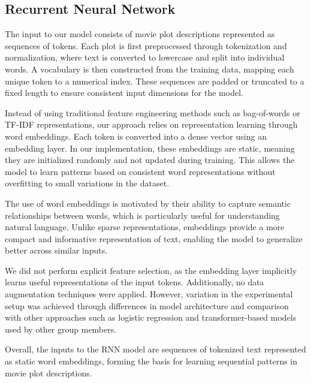 \subsection{Recurrent Neural Network}

The input to our model consists of movie plot descriptions represented as sequences of tokens. Each plot is first preprocessed through tokenization and normalization, where text is converted to lowercase and split into individual words. A vocabulary is then constructed from the training data, mapping each unique token to a numerical index. These sequences are padded or truncated to a fixed length to ensure consistent input dimensions for the model.

Instead of using traditional feature engineering methods such as bag-of-words or TF-IDF representations, our approach relies on representation learning through word embeddings. Each token is converted into a dense vector using an embedding layer. In our implementation, these embeddings are static, meaning they are initialized randomly and not updated during training. This allows the model to learn patterns based on consistent word representations without overfitting to small variations in the dataset.

The use of word embeddings is motivated by their ability to capture semantic relationships between words, which is particularly useful for understanding natural language. Unlike sparse representations, embeddings provide a more compact and informative representation of text, enabling the model to generalize better across similar inputs.

We did not perform explicit feature selection, as the embedding layer implicitly learns useful representations of the input tokens. Additionally, no data augmentation techniques were applied. However, variation in the experimental setup was achieved through differences in model architecture and comparison with other approaches such as logistic regression and transformer-based models used by other group members.

Overall, the inputs to the RNN model are sequences of tokenized text represented as static word embeddings, forming the basis for learning sequential patterns in movie plot descriptions.